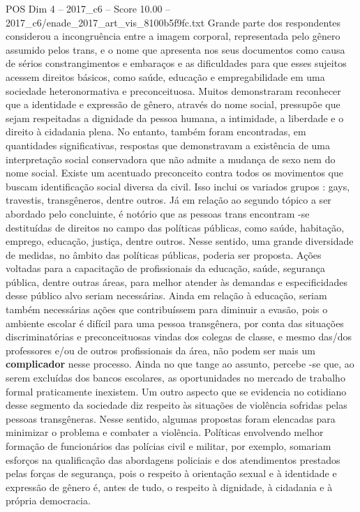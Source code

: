 \begin{textsample}{POS Dim 4 – 2017\_c6 – Score 10.00 – 2017\_c6/enade\_2017\_art\_vis\_8100b5f9fc.txt}
Grande parte dos respondentes considerou a incongruência entre a imagem corporal, representada pelo gênero assumido pelos trans, e o nome que apresenta nos seus documentos como causa de sérios constrangimentos e embaraços e as dificuldades para que esses sujeitos acessem direitos básicos, como saúde, educação e empregabilidade em uma sociedade heteronormativa e preconceituosa.
Muitos demonstraram reconhecer que a identidade e expressão de gênero, através do nome social, pressupõe que sejam respeitadas a dignidade da pessoa humana, a intimidade, a liberdade e o direito à cidadania plena.
No entanto, também foram encontradas, em quantidades significativas, respostas que demonstravam a existência de uma interpretação social conservadora que não admite a mudança de sexo nem do nome social.
Existe um acentuado preconceito contra todos os movimentos que buscam identificação social diversa da civil.
Isso inclui os variados grupos : gays, travestis, transgêneros, dentre outros.
Já em relação ao segundo tópico a ser abordado pelo concluinte, é notório que as pessoas trans encontram -se destituídas de direitos no campo das políticas públicas, como saúde, habitação, emprego, educação, justiça, dentre outros.
Nesse sentido, uma grande diversidade de medidas, no âmbito das políticas públicas, poderia ser proposta.
Ações voltadas para a capacitação de profissionais da educação, saúde, segurança pública, dentre outras áreas, para melhor atender às demandas e especificidades desse público alvo seriam necessárias.
Ainda em relação à educação, seriam também necessárias ações que contribuíssem para diminuir a evasão, pois o ambiente escolar é difícil para uma pessoa transgênera, por conta das situações discriminatórias e preconceituosas vindas dos colegas de classe, e mesmo das/dos professores e/ou de outros profissionais da área, não podem ser mais um \textbf{complicador} nesse processo.
Ainda no que tange ao assunto, percebe -se que, ao serem excluídas dos bancos escolares, as oportunidades no mercado de trabalho formal praticamente inexistem.
Um outro aspecto que se evidencia no cotidiano desse segmento da sociedade diz respeito às situações de violência sofridas pelas pessoas transgêneras.
Nesse sentido, algumas propostas foram elencadas para minimizar o problema e combater a violência.
Políticas envolvendo melhor formação de funcionários das polícias civil e militar, por exemplo, somariam esforços na qualificação das abordagens policiais e dos atendimentos prestados pelas forças de segurança, pois o respeito à orientação sexual e à identidade e expressão de gênero é, antes de tudo, o respeito à dignidade, à cidadania e à própria democracia.

\end{textsample}
